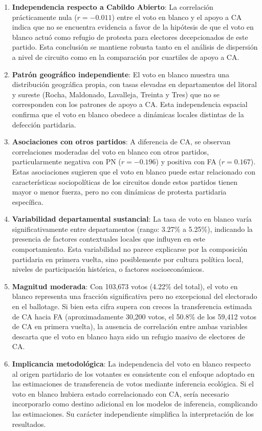\begin{enumerate}
    \item \textbf{Independencia respecto a Cabildo Abierto}: La correlación prácticamente nula ($r = -0.011$) entre el voto en blanco y el apoyo a CA indica que no se encuentra evidencia a favor de la hipótesis de que el voto en blanco actuó como refugio de protesta para electores decepcionados de este partido. Esta conclusión se mantiene robusta tanto en el análisis de dispersión a nivel de circuito como en la comparación por cuartiles de apoyo a CA.

    \item \textbf{Patrón geográfico independiente}: El voto en blanco muestra una distribución geográfica propia, con tasas elevadas en departamentos del litoral y sureste (Rocha, Maldonado, Lavalleja, Treinta y Tres) que no se corresponden con los patrones de apoyo a CA. Esta independencia espacial confirma que el voto en blanco obedece a dinámicas locales distintas de la defección partidaria.

    \item \textbf{Asociaciones con otros partidos}: A diferencia de CA, se observan correlaciones moderadas del voto en blanco con otros partidos, particularmente negativa con PN ($r = -0.196$) y positiva con FA ($r = 0.167$). Estas asociaciones sugieren que el voto en blanco puede estar relacionado con características sociopolíticas de los circuitos donde estos partidos tienen mayor o menor fuerza, pero no con dinámicas de protesta partidaria específica.

    \item \textbf{Variabilidad departamental sustancial}: La tasa de voto en blanco varía significativamente entre departamentos (rango: 3.27\% a 5.25\%), indicando la presencia de factores contextuales locales que influyen en este comportamiento. Esta variabilidad no parece explicarse por la composición partidaria en primera vuelta, sino posiblemente por cultura política local, niveles de participación histórica, o factores socioeconómicos.

    \item \textbf{Magnitud moderada}: Con 103,673 votos (4.22\% del total), el voto en blanco representa una fracción significativa pero no excepcional del electorado en el ballotage. Si bien esta cifra supera con creces la transferencia estimada de CA hacia FA (aproximadamente 30{,}200 votos, el 50.8\% de los 59{,}412 votos de CA en primera vuelta), la ausencia de correlación entre ambas variables descarta que el voto en blanco haya sido un refugio masivo de electores de CA.

    \item \textbf{Implicancia metodológica}: La independencia del voto en blanco respecto al origen partidario de los votantes es consistente con el enfoque adoptado en las estimaciones de transferencia de votos mediante inferencia ecológica. Si el voto en blanco hubiera estado correlacionado con CA, sería necesario incorporarlo como destino adicional en los modelos de inferencia, complicando las estimaciones. Su carácter independiente simplifica la interpretación de los resultados.
\end{enumerate}

